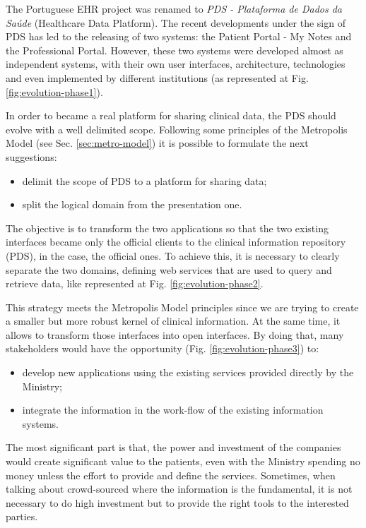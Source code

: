 The Portuguese EHR project was renamed to \textit{PDS - Plataforma de Dados da Saúde} (Healthcare Data Platform). The recent developments under the sign of PDS has led to the releasing of two systems: the Patient Portal - My Notes and the Professional Portal. However, these two systems were developed almost as independent systems, with their own user interfaces, architecture, technologies and even implemented by different institutions (as represented at Fig. \ref{fig:evolution-phase1}).


In order to became a real platform for sharing clinical data, the PDS should evolve with a well delimited scope. Following some principles of the Metropolis Model (see Sec. \ref{sec:metro-model}) it is possible to formulate the next suggestions:
\begin{itemize}
\item delimit the scope of PDS to a platform for sharing data;
\item split the logical domain from the presentation one.
\end{itemize}

The objective is to transform the two applications so that the two existing interfaces became only the official clients to the clinical information repository (PDS), in the case, the official ones. To achieve this, it is necessary to clearly separate the two domains, defining web services that are used to query and retrieve data, like represented at Fig. \ref{fig:evolution-phase2}.


This strategy meets the Metropolis Model principles since we are trying to create a smaller but more robust kernel of clinical information. At the same time, it allows to transform those interfaces into open interfaces. By doing that, many stakeholders would have the opportunity (Fig. \ref{fig:evolution-phase3}) to: 
\begin{itemize}
\item develop new applications using the existing services provided directly by the Ministry;
\item integrate the information in the work-flow of the existing information systems.
\end{itemize}

The most significant part is that, the power and investment of the companies would create significant value to the patients, even with the Ministry spending no money unless the effort to provide and define the services. Sometimes, when talking about crowd-sourced where the information is the fundamental, it is not necessary to do high investment but to provide the right tools to the interested parties.

